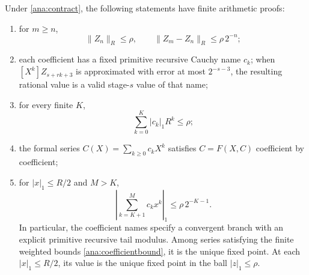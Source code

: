 \begin{theorem}
\label{ana:series}
Under \eqref{ana:contract}, the following statements have finite arithmetic
proofs:
\begin{enumerate}
\item for $m\ge n$,
\begin{equation}
 \lVert Z_n\rVert_R\le\rho,
 \qquad
 \lVert Z_m-Z_n\rVert_R\le\rho\,2^{-n};
 \label{ana:iterate}
\end{equation}
\item each coefficient has a fixed primitive recursive Cauchy name $c_k$;
when $[X^k]Z_{s+rk+3}$ is approximated with error at most $2^{-s-3}$,
the resulting rational value is a valid stage-$s$ value of that name;
\item for every finite $K$,
\begin{equation}
 \sum_{k=0}^K |c_k|_1R^k\le\rho;
 \label{ana:coefficientbound}
\end{equation}
\item the formal series $C(X)=\sum_{k\ge0}c_kX^k$ satisfies
$C=F(X,C)$ coefficient by coefficient;
\item for $|x|_1\le R/2$ and $M>K$,
\begin{equation}
 \left|\sum_{k=K+1}^M c_kx^k\right|_1
 \le\rho\,2^{-K-1}.
 \label{ana:tail}
\end{equation}
In particular, the coefficient names specify a convergent branch with an
explicit primitive recursive tail modulus.  Among series satisfying the
finite weighted bounds \eqref{ana:coefficientbound}, it is the unique
fixed point.  At each $|x|_1\le R/2$, its value is the unique fixed point
in the ball $|z|_1\le\rho$.
\end{enumerate}
\end{theorem}

